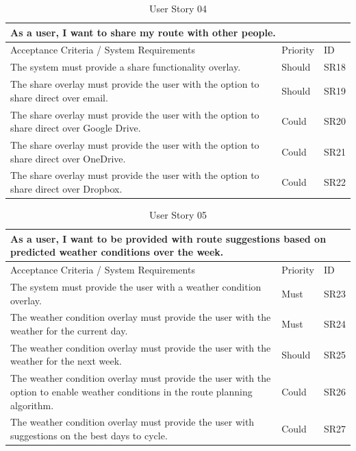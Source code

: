 \begin{table}[!htb]
\caption{User Story 04}
\label{tab:user-story-04}
\begin{tabular}{ p{8cm} p{1cm}  p{1cm} }
\hline
\multicolumn{3}{p{13cm}}{As a user, I want to share my route with other people.}\\ 
\hline
Acceptance Criteria / System Requirements & Priority & ID\\
\hline
The system must provide a share functionality overlay. & Should & SR18 \\
The share overlay must provide the user with the option to share direct over email. & Should & SR19\\
The share overlay must provide the user with the option to share direct over Google Drive. & Could & SR20\\ 
The share overlay must provide the user with the option to share direct over OneDrive. & Could & SR21\\ 
The share overlay must provide the user with the option to share direct over Dropbox. & Could & SR22\\ 
\hline
\end{tabular}
\end{table}

\begin{table}[!htb]
\caption{User Story 05}
\label{tab:user-story-05}
\begin{tabular}{ p{8cm} p{1cm}  p{1cm} }
\hline
\multicolumn{3}{p{13cm}}{As a user, I want to be provided with route suggestions based on predicted weather conditions over the week.}\\ 
\hline
Acceptance Criteria / System Requirements & Priority & ID\\
\hline
The system must provide the user with a weather condition overlay. & Must & SR23 \\
The weather condition overlay must provide the user with the weather for the current day. & Must & SR24\\
The weather condition overlay must provide the user with the weather for the next week. & Should & SR25\\
The weather condition overlay must provide the user with the option to enable weather conditions in the route planning algorithm. & Could & SR26\\ 
The weather condition overlay must provide the user with suggestions on the best days to cycle. & Could & SR27\\ 
\hline
\end{tabular}
\end{table}

